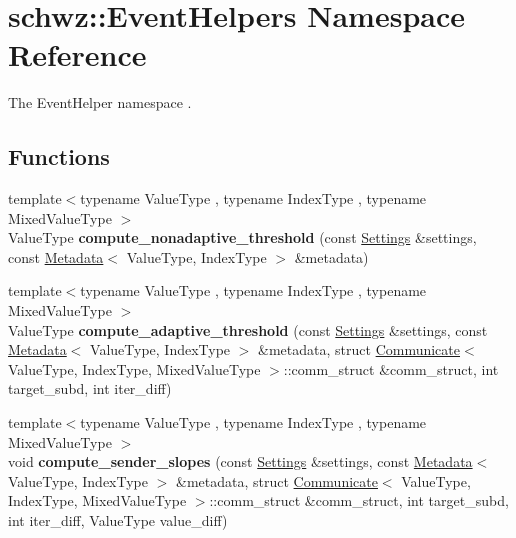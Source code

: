 \hypertarget{namespaceschwz_1_1EventHelpers}{}\section{schwz\+:\+:Event\+Helpers Namespace Reference}
\label{namespaceschwz_1_1EventHelpers}


The Event\+Helper namespace .  


\subsection*{Functions}
\begin{DoxyCompactItemize}
\item 
\mbox{\label{namespaceschwz_1_1EventHelpers_af3426fb8505cc11bb5eeb9ec14a61b2a}} 
{\footnotesize template$<$typename Value\+Type , typename Index\+Type , typename Mixed\+Value\+Type $>$ }\\Value\+Type {\bfseries compute\+\_\+nonadaptive\+\_\+threshold} (const \hyperlink{structschwz_1_1Settings}{Settings} \&settings, const \hyperlink{structschwz_1_1Metadata}{Metadata}$<$ Value\+Type, Index\+Type $>$ \&metadata)
\item 
\mbox{\label{namespaceschwz_1_1EventHelpers_a8b0ef495ae54545747b8caf0d25aaaef}} 
{\footnotesize template$<$typename Value\+Type , typename Index\+Type , typename Mixed\+Value\+Type $>$ }\\Value\+Type {\bfseries compute\+\_\+adaptive\+\_\+threshold} (const \hyperlink{structschwz_1_1Settings}{Settings} \&settings, const \hyperlink{structschwz_1_1Metadata}{Metadata}$<$ Value\+Type, Index\+Type $>$ \&metadata, struct \hyperlink{classschwz_1_1Communicate}{Communicate}$<$ Value\+Type, Index\+Type, Mixed\+Value\+Type $>$\+::comm\+\_\+struct \&comm\+\_\+struct, int target\+\_\+subd, int iter\+\_\+diff)
\item 
\mbox{\label{namespaceschwz_1_1EventHelpers_a908e89a6f642e50e3be947411613a8bf}} 
{\footnotesize template$<$typename Value\+Type , typename Index\+Type , typename Mixed\+Value\+Type $>$ }\\void {\bfseries compute\+\_\+sender\+\_\+slopes} (const \hyperlink{structschwz_1_1Settings}{Settings} \&settings, const \hyperlink{structschwz_1_1Metadata}{Metadata}$<$ Value\+Type, Index\+Type $>$ \&metadata, struct \hyperlink{classschwz_1_1Communicate}{Communicate}$<$ Value\+Type, Index\+Type, Mixed\+Value\+Type $>$\+::comm\+\_\+struct \&comm\+\_\+struct, int target\+\_\+subd, int iter\+\_\+diff, Value\+Type value\+\_\+diff)

\end{DoxyCompactItemize}
